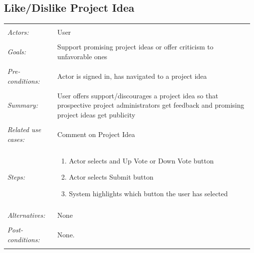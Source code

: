 \documentclass[11pt]{report}
\begin{document}
\subsection{Like/Dislike Project Idea}
\begin{tabular}{ p{2cm} p{12cm} }
 \hline
 \\
 \textit{Actors:} & User \\ 
 \\
 \textit{Goals:} & Support promising project ideas or offer criticism to unfavorable ones  \\
 \\
 \textit{Pre-conditions:} & Actor is signed in, has navigated to a project idea  \\
 \\
 \textit{Summary:} &  User offers support/discourages a project idea so that prospective project administrators get feedback and promising project ideas get publicity \\ 
 \\
 \textit{Related use cases:} & Comment on Project Idea \\ 
 \\
 \textit{Steps:} & \begin{enumerate}
  \item Actor selects and Up Vote or Down Vote button
  \item Actor selects Submit button 
  \item System highlights which button the user has selected
 \end{enumerate} \\
 \\
 \textit{Alternatives:} & None \\
 \\
 \textit{Post-conditions:} & None. \\
 \\
\hline
\end{tabular}
\end{document}
